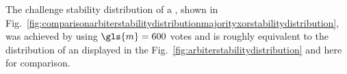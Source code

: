 The challenge stability distribution of a \mxpuf, shown in Fig.\ \ref{fig:comparisonarbiterstabilitydistributionmajorityxorstabilitydistribution}, was achieved by using $\gls{m} = 600$ votes and is roughly equivalent to the distribution of an \apuf displayed in the Fig.\ \ref{fig:arbiterstabilitydistribution} and here for comparison.




